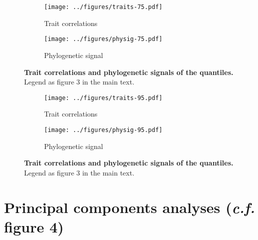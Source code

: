 \documentclass[12pt]{report}
\begin{document}
\begin{figure}[h!]
  \begin{center}
    \begin{subfigure}{.45\textwidth}
      \texttt{[image: ../figures/traits-75.pdf]}
      \caption{Trait correlations}
    \end{subfigure}
    \begin{subfigure}{.45\textwidth}
      \texttt{[image: ../figures/physig-75.pdf]}
      \caption{Phylogenetic signal}
    \end{subfigure}
  \end{center}
  \caption{\textbf{Trait correlations and phylogenetic signals of the
       quantiles.} Legend as figure 3 in the main text.}
  \label{traits}
\end{figure}
\begin{figure}[h!]
  \begin{center}
    \begin{subfigure}{.45\textwidth}
      \texttt{[image: ../figures/traits-95.pdf]}
      \caption{Trait correlations}
    \end{subfigure}
    \begin{subfigure}{.45\textwidth}
      \texttt{[image: ../figures/physig-95.pdf]}
      \caption{Phylogenetic signal}
    \end{subfigure}
  \end{center}
  \caption{\textbf{Trait correlations and phylogenetic signals of the
       quantiles.} Legend as figure 3 in the main text.}
  \label{traits}
\end{figure}

\clearpage
\section{Principal components analyses (\emph{c.f.} figure 4)}
\end{document}
